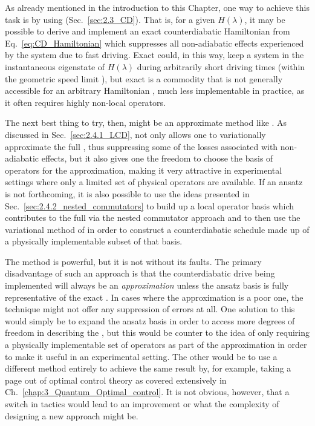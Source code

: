As already mentioned in the introduction to this Chapter, one way to achieve this task is by using  (Sec.~\ref{sec:2.3_CD}). That is, for a given $H(\lambda)$, it may be possible to derive and implement an exact counterdiabatic Hamiltonian from Eq.~\ref{eq:CD_Hamiltonian} which suppresses all non-adiabatic effects experienced by the system due to fast driving. Exact  could, in this way, keep a system in the instantaneous eigenstate of $H(\lambda)$ during arbitrarily short driving times (within the geometric speed limit \cite{bukov_geometric_2019}), but exact  is a commodity that is not generally accessible for an arbitrary Hamiltonian \cite{kolodrubetz_geometry_2017}, much less implementable in practice, as it often requires highly non-local operators. 

The next best thing to try, then, might be an approximate  method like . As discussed in Sec.~\ref{sec:2.4.1_LCD},  not only allows one to variationally approximate the full , thus suppressing some of the losses associated with non-adiabatic effects, but it also gives one the freedom to choose the basis of operators for the approximation, making it very attractive in experimental settings where only a limited set of physical operators are available. If an ansatz is not forthcoming, it is also possible to use the ideas presented in Sec.~\ref{sec:2.4.2_nested_commutators} to build up a local operator basis which contributes to the full  via the nested commutator approach \cite{geier_floquet_2021} and to then use the variational method of  in order to construct a counterdiabatic schedule made up of a physically implementable subset of that basis. 

The  method is powerful, but it is not without its faults. The primary disadvantage of such an approach is that the counterdiabatic drive being implemented will always be an \emph{approximation} unless the ansatz basis is fully representative of the exact . In cases where the approximation is a poor one, the  technique might not offer any suppression of errors at all. One solution to this would simply be to expand the ansatz basis in order to access more degrees of freedom in describing the , but this would be counter to the idea of only requiring a physically implementable set of operators as part of the approximation in order to make it useful in an experimental setting. The other would be to use a different method entirely to achieve the same result by, for example, taking a page out of optimal control theory as covered extensively in Ch.~\ref{chap:3_Quantum_Optimal_control}. It is not obvious, however, that a switch in tactics would lead to an improvement or what the complexity of designing a new approach might be.

